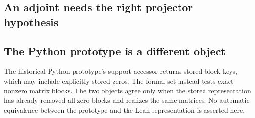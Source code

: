 \subsection{An adjoint needs the right projector hypothesis}

\subsection{The Python prototype is a different object}
The historical Python prototype's support accessor returns stored block keys, which may include explicitly stored zeros. The formal  set instead tests exact nonzero matrix blocks. The two objects agree only when the stored representation has already removed all zero blocks and realizes the same matrices. No automatic equivalence between the prototype and the Lean representation is asserted here.
